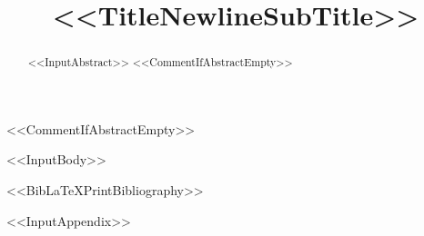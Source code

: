 \documentclass[%
secnum,
<<DocumentClassOptions>>]{lapreprint}
\title{<<TitleNewlineSubTitle>>}
\begin{document}
\maketitle

<<CommentIfAbstractEmpty>>\begin{abstract}
<<InputAbstract>>
<<CommentIfAbstractEmpty>>\end{abstract}

<<InputBody>>

<<BibLaTeXPrintBibliography>>

\if@endfloat\clearpage\processdelayedfloats\clearpage\fi

\appendix
<<InputAppendix>>
\end{document}
